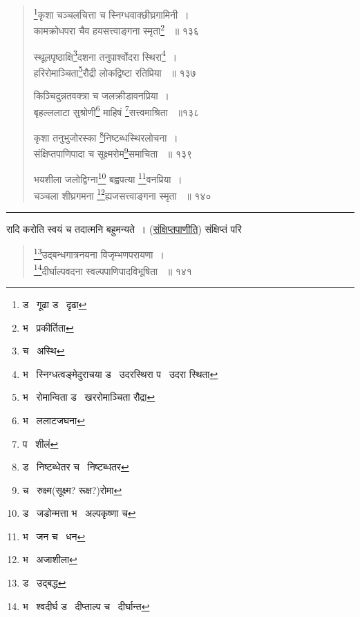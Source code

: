 \documentclass[11pt, openany]{book}
\begin{document}
{\begin{quote}
{\renewcommand{\thefootnote}{7}\footnote{ड \textendash\ गूढा ड \textendash\ दृढा}कृशा चञ्चलचित्ता च स्निग्धवाक्छीघ्रगामिनी~। \\
कामक्रोधपरा चैव हयसत्त्वाङ्गना स्मृता\renewcommand{\thefootnote}{8}\footnote{भ \textendash\ प्रकीर्तिता} ~॥ १३६ 

स्थूलपृष्ठाक्षि\renewcommand{\thefootnote}{9}\footnote{च \textendash\ अस्थि}दशना तनुपार्श्वोदरा स्थिरा\renewcommand{\thefootnote}{10}\footnote{भ \textendash\ स्निग्धत्वङ्मेदुराचया ड \textendash\ उदरस्थिरा प \textendash\ उदरा स्थिता}~।\\ 
हरिरोमाञ्चिता\renewcommand{\thefootnote}{11}\footnote{भ \textendash\ रोमान्विता ड \textendash\ खररोमाञ्चिता रौद्रा}रौद्री लोकद्विष्टा रतिप्रिया ~॥ १३७ 

किञ्चिदुन्नतवक्त्रा च जलक्रीडावनप्रिया~।\\ 
बृहल्ललाटा सुश्रोणी\renewcommand{\thefootnote}{12}\footnote{भ \textendash\ ललाटजघना } माहिषं \renewcommand{\thefootnote}{13}\footnote{प \textendash\ शीलं }सत्त्वमाश्रिता ~॥१३८ 

कृशा तनुभुजोरस्का \renewcommand{\thefootnote}{14}\footnote{ड \textendash\ निष्टब्धेतर च \textendash\ निष्टब्धतर}निष्टब्धस्थिरलोचना~।\\ 
संक्षिप्तपाणिपादा च सूक्ष्मरोम\renewcommand{\thefootnote}{15}\footnote{च \textendash\ रुक्ष्म(सूक्ष्म? रूक्ष?)रोमा}समाचिता ~॥ १३९ 

भयशीला जलोद्विग्ना\renewcommand{\thefootnote}{16}\footnote{ड \textendash\ जडोन्मत्ता भ \textendash\ अल्पकृष्णा च} बह्वपत्या \renewcommand{\thefootnote}{17}\footnote{भ \textendash\ जन च \textendash\ धन }वनप्रिया~। \\
चञ्चला शीघ्रगमना \renewcommand{\thefootnote}{18}\footnote{भ \textendash\ अजाशीला }ह्यजसत्त्वाङ्गना स्मृता ~॥ १४० }
\end{quote}

\hrule

\vspace{2mm}

\noindent
रादि करोति स्वयं च तदात्मनि बहुमन्यते~। (\underline{संक्षिप्तपाणीति}) संक्षिप्तं परि\textendash\ 

 
\newpage

\lfoot{}

\begin{quote}
 {\na \renewcommand{\thefootnote}{1}\footnote{ड \textendash\ उद्बद्ध}उद्बन्धगात्रनयना विजृम्भणपरायणा~। \\
\renewcommand{\thefootnote}{2}\footnote{भ \textendash\ श्वदीर्घ ड \textendash\ दीप्ताल्प च \textendash\ दीर्घान्त}दीर्घाल्पवदना स्वल्पपाणिपादविभूषिता ~॥ १४१ 

}
\end{quote}}
\end{document}
